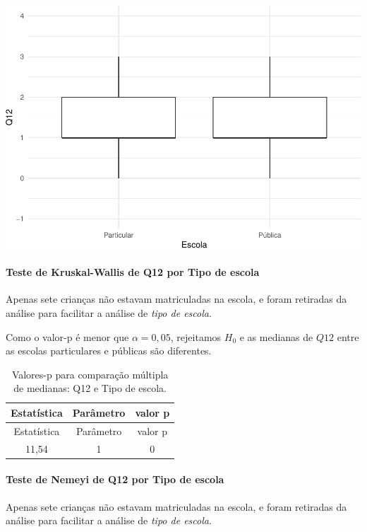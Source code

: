\documentclass[]{article}
\let\oldparagraph\paragraph
\renewcommand{\paragraph}[1]{\oldparagraph{#1}\mbox{}}
\begin{document}
\begin{center}\includegraphics[width=0.75\linewidth]{relatorio_files/figure-latex/unnamed-chunk-49-1} \end{center}

\hypertarget{teste-de-kruskal-wallis-de-q12-por-tipo-de-escola}{%
\paragraph{Teste de Kruskal-Wallis de Q12 por Tipo de escola}\label{teste-de-kruskal-wallis-de-q12-por-tipo-de-escola}}

Apenas sete crianças não estavam matriculadas na escola, e foram retiradas da análise para facilitar a análise de \emph{tipo de escola}.

Como o valor-p é menor que \(\alpha=0,05\), rejeitamos \(H_0\) e as medianas de \(Q12\) entre as escolas particulares e públicas são diferentes.

\begin{longtable}[]{@{}ccc@{}}
\caption{\label{tab:unnamed-chunk-50}Valores-p para comparação múltipla de medianas: Q12 e Tipo de escola.}\tabularnewline
\toprule
Estatística & Parâmetro & valor p\tabularnewline
\midrule
\endfirsthead
\toprule
Estatística & Parâmetro & valor p\tabularnewline
\midrule
\endhead
11,54 & 1 & 0\tabularnewline
\bottomrule
\end{longtable}

\hypertarget{teste-de-nemeyi-de-q12-por-tipo-de-escola}{%
\paragraph{Teste de Nemeyi de Q12 por Tipo de escola}\label{teste-de-nemeyi-de-q12-por-tipo-de-escola}}

Apenas sete crianças não estavam matriculadas na escola, e foram retiradas da análise para facilitar a análise de \emph{tipo de escola}.
\end{document}
